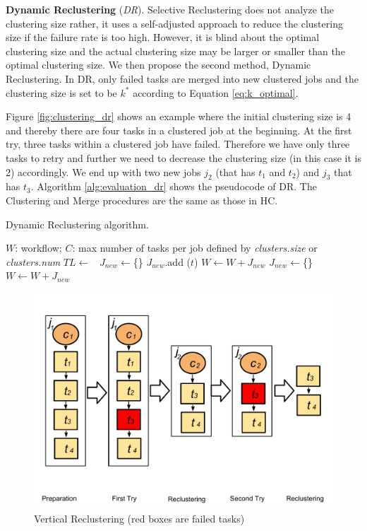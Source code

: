 \textbf{Dynamic Reclustering} (\emph{DR}). 
Selective Reclustering does not analyze the clustering size rather, it uses a self-adjusted approach to reduce the clustering size if the failure rate is too high. However, it is blind about the optimal clustering size and the actual clustering size may be larger or smaller than the optimal clustering size. We then propose the second method, Dynamic Reclustering. In DR, only failed tasks are merged into new clustered jobs and the clustering size is set to be $k^*$ according to Equation \ref{eq:k_optimal}.



Figure \ref{fig:clustering_dr} shows an example where the initial clustering size is 4 and thereby there are four tasks in a clustered job at the beginning. At the first try, three tasks within a clustered job have failed. Therefore we have only three tasks to retry and further we need to decrease the clustering size (in this case it is 2) accordingly. We end up with two new jobs $j_2$ (that has $t_1$ and $t_2$) and $j_3$ that has $t_3$. Algorithm \ref{alg:evaluation_dr} shows the pseudocode of DR. The Clustering and Merge procedures are the same as those in HC. 

\begin{algorithm}[!htb]
	\footnotesize
	\caption{Dynamic Reclustering algorithm.}
	\label{alg:evaluation_dr}
	\begin{algorithmic}[1]
		\Require $W$: workflow; $C$: max number of tasks per job defined by \emph{clusters.size} or \emph{clusters.num}
			\State $TL \gets$\ 
			\State $J_{new}\gets$\{\}
					\State $J_{new}$.add ($t$)
				\EndIf
					\State $W \gets W + J_{new}$
					\State $J_{new}\gets$\{\}
				\EndIf
			\EndFor
			\State $W \gets W + J_{new}$ 
		\EndProcedure
	\end{algorithmic}
\end{algorithm}

\begin{figure}[!htb]
\centering
  \includegraphics[width=0.75\linewidth]{figures/tolerance/vr.pdf}
  \caption{Vertical Reclustering (red boxes are failed tasks)}
  \label{fig:clustering_vr}
\end{figure}


